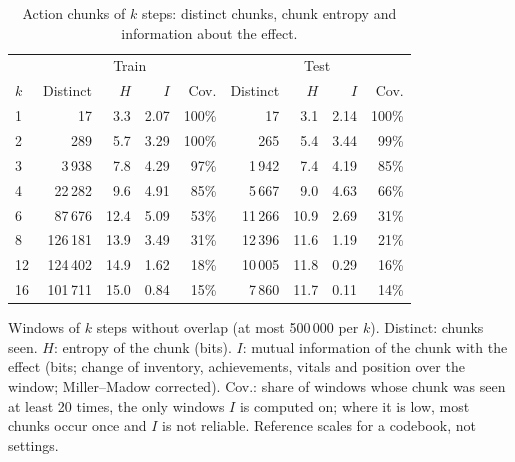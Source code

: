 \begin{table}[H]
\centering
\caption{Action chunks of $k$ steps: distinct chunks, chunk entropy and information about the effect.}
\label{tab:data-chunks}
\small
\setlength{\tabcolsep}{3.5pt}
\begin{tabular}{lrrrrrrrr}
\toprule
& \multicolumn{4}{c}{Train} & \multicolumn{4}{c}{Test} \\
 $k$ & Distinct & $H$ & $I$ & Cov. & Distinct & $H$ & $I$ & Cov. \\
\midrule
1 & 17 & 3.3 & 2.07 & 100\% & 17 & 3.1 & 2.14 & 100\% \\
2 & 289 & 5.7 & 3.29 & 100\% & 265 & 5.4 & 3.44 & 99\% \\
3 & 3\,938 & 7.8 & 4.29 & 97\% & 1\,942 & 7.4 & 4.19 & 85\% \\
4 & 22\,282 & 9.6 & 4.91 & 85\% & 5\,667 & 9.0 & 4.63 & 66\% \\
6 & 87\,676 & 12.4 & 5.09 & 53\% & 11\,266 & 10.9 & 2.69 & 31\% \\
8 & 126\,181 & 13.9 & 3.49 & 31\% & 12\,396 & 11.6 & 1.19 & 21\% \\
12 & 124\,402 & 14.9 & 1.62 & 18\% & 10\,005 & 11.8 & 0.29 & 16\% \\
16 & 101\,711 & 15.0 & 0.84 & 15\% & 7\,860 & 11.7 & 0.11 & 14\% \\
\bottomrule
\end{tabular}

\vspace{4pt}
\begin{minipage}{\linewidth}
\footnotesize\raggedright Windows of $k$ steps without overlap (at most 500\,000 per $k$). Distinct: chunks seen. $H$: entropy of the chunk (bits). $I$: mutual information of the chunk with the effect (bits; change of inventory, achievements, vitals and position over the window; Miller--Madow corrected). Cov.: share of windows whose chunk was seen at least 20 times, the only windows $I$ is computed on; where it is low, most chunks occur once and $I$ is not reliable. Reference scales for a codebook, not settings.
\end{minipage}
\end{table}
